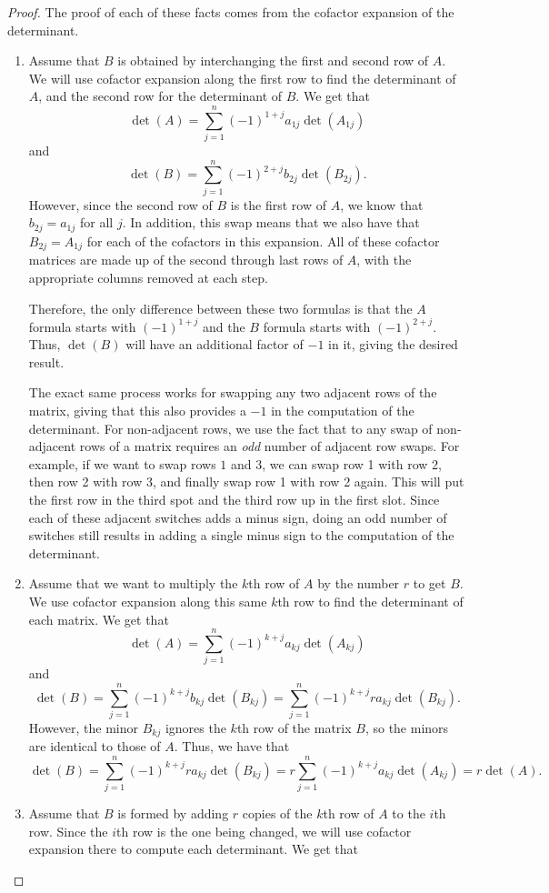 \documentclass{ximera}
\begin{document}
\begin{proof}
    The proof of each of these facts comes from the cofactor expansion of the determinant.
    \begin{enumerate}
        \item Assume that $B$ is obtained by interchanging the first and second row of $A$. We will use cofactor expansion along the first row to find the determinant of $A$, and the second row for the determinant of $B$. We get that
        \[ 
            \det(A) = \sum_{j=1}^n (-1)^{1+j}a_{1j} \det(A_{1j}) 
        \] 
        and 
        \[ 
            \det(B) = \sum_{j=1}^n (-1)^{2+j}b_{2j} \det(B_{2j}). 
        \] 
        However, since the second row of $B$ is the first row of $A$, we know that $b_{2j} = a_{1j}$ for all $j$. In addition, this swap means that we also have that $B_{2j} = A_{1j}$ for each of the cofactors in this expansion. All of these cofactor matrices are made up of the second through last rows of $A$, with the appropriate columns removed at each step. 
        
        Therefore, the only difference between these two formulas is that the $A$ formula starts with $(-1)^{1+j}$ and the $B$ formula starts with $(-1)^{2+j}$. Thus, $\det(B)$ will have an additional factor of $-1$ in it, giving the desired result.
        
        The exact same process works for swapping any two adjacent rows of the matrix, giving that this also provides a $-1$ in the computation of the determinant. For non-adjacent rows, we use the fact that to any swap of non-adjacent rows of a matrix requires an \emph{odd} number of adjacent row swaps. For example, if we want to swap rows $1$ and $3$, we can swap row 1 with row 2, then row 2 with row 3, and finally swap row 1 with row 2 again. This will put the first row in the third spot and the third row up in the first slot. Since each of these adjacent switches adds a minus sign, doing an odd number of switches still results in adding a single minus sign to the computation of the determinant.
        
        \item Assume that we want to multiply the $k$th row of $A$ by the number $r$ to get $B$. We use cofactor expansion along this same $k$th row to find the determinant of each matrix. We get that
        \[ 
            \det(A) = \sum_{j=1}^n (-1)^{k+j}a_{kj}\det(A_{kj}) 
        \] 
        and
        \[ 
            \det(B) = \sum_{j=1}^n (-1)^{k+j}b_{kj}\det(B_{kj}) = \sum_{j=1}^n (-1)^{k+j}ra_{kj} \det(B_{kj}). 
        \] 
        However, the minor $B_{kj}$ ignores the $k$th row of the matrix $B$, so the minors are identical to those of $A$. Thus, we have that
        \[ 
            \det(B) = \sum_{j=1}^n (-1)^{k+j}ra_{kj} \det(B_{kj}) = r\sum_{j=1}^n (-1)^{k+j}a_{kj} \det(A_{kj}) = r\det(A) .
        \]
        \item Assume that $B$ is formed by adding $r$ copies of the $k$th row of $A$ to the $i$th row. Since the $i$th row is the one being changed, we will use cofactor expansion there to compute each determinant. We get that
        

\end{enumerate}
\end{proof}
\end{document}
